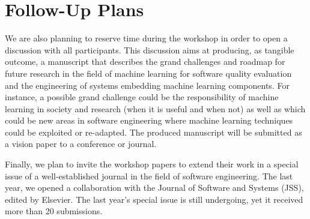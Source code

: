 
\section{Follow-Up Plans}

We are also planning to reserve time during the workshop in order to open a discussion with all participants.
This discussion aims at producing, as tangible outcome, a manuscript that describes the grand challenges and roadmap for future research in the field of machine learning for software quality evaluation and the engineering of systems embedding machine learning components.
For instance, a possible grand challenge could be the responsibility of machine learning in society and research (\eg when it is useful and when not) as well as which could be new areas in software engineering where machine learning techniques could be exploited or re-adapted.
The produced manuscript will be submitted as a vision paper to a conference or journal.

Finally, we plan to invite the workshop papers to extend their work in a special issue of a well-established journal in the field of software engineering.
The last year, we opened a collaboration with the Journal of Software and Systems (JSS), edited by Elsevier.
The last year's special issue is still undergoing, yet it received more than 20 submissions.
